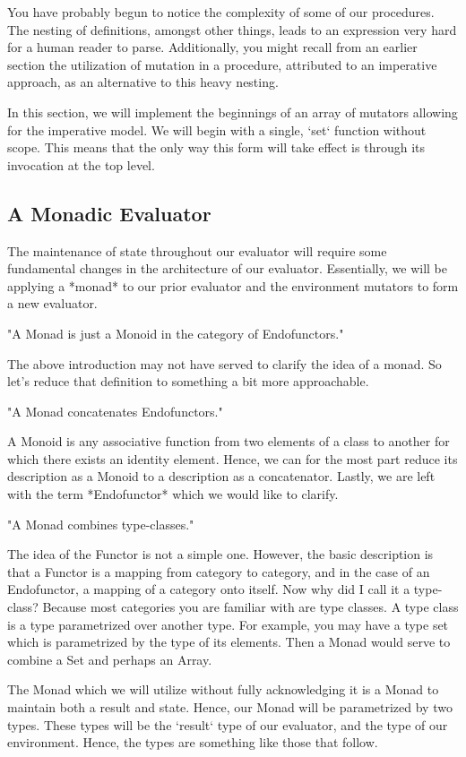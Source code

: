 You have probably begun to notice the complexity of some of our procedures.
The nesting of definitions, amongst other things, leads to an expression very
hard for a human reader to parse. Additionally, you might recall from an
earlier section the utilization of mutation in a procedure, attributed to an
imperative approach, as an alternative to this heavy nesting.

In this section, we will implement the beginnings of an array of mutators
allowing for the imperative model. We will begin with a single, `set` 
function without scope. This means that the only way this form will take
effect is through its invocation at the top level.

\subsection{A Monadic Evaluator}
The maintenance of state throughout our evaluator will require some 
fundamental changes in the architecture of our evaluator. Essentially, we 
will be applying a *monad* to our prior evaluator and the environment 
mutators to form a new evaluator.

"A Monad is just a Monoid in the category of Endofunctors."

The above introduction may not have served to clarify the idea of a monad. So
let's reduce that definition to something a bit more approachable.

"A Monad concatenates Endofunctors."

A Monoid is any associative function from two elements of a class to another
for which there exists an identity element. Hence, we can for the most part
reduce its description as a Monoid to a description as a concatenator. 
Lastly, we are left with the term *Endofunctor* which we would like to 
clarify.

"A Monad combines type-classes."

The idea of the Functor is not a simple one. However, the basic description
is that a Functor is a mapping from category to category, and in the case of
an Endofunctor, a mapping of a category onto itself. Now why did I call it a
type-class? Because most categories you are familiar with are type classes.
A type class is a type parametrized over another type. For example, you may
have a type set which is parametrized by the type of its elements. Then a
Monad would serve to combine a Set and perhaps an Array.

The Monad which we will utilize without fully acknowledging it is a Monad
to maintain both a result and state. Hence, our Monad will be parametrized
by two types. These types will be the `result` type of our evaluator, and the
type of our environment. Hence, the types are something like those that
follow.

